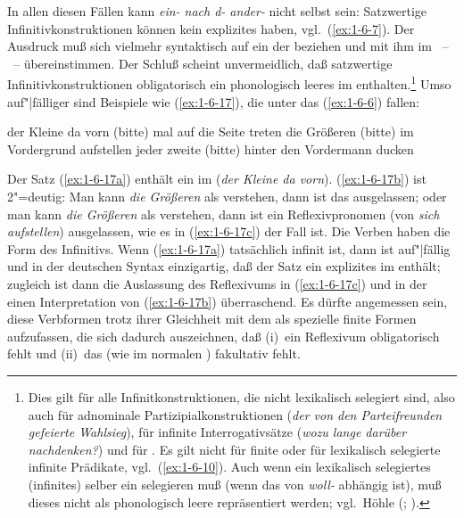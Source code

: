 \documentclass[output=paper]{langsci/langscibook}
\begin{document}
In allen diesen Fällen kann \textit{ein- nach d- ander-} nicht selbst  sein: Satzwertige Infinitivkonstruktionen können kein explizites  haben, vgl.\ (\ref{ex:1-6-7}). Der Ausdruck muß sich vielmehr syntaktisch auf ein  der  beziehen und mit ihm im ~-- ~– übereinstimmen. Der Schluß scheint unvermeidlich, daß satzwertige Infinitivkonstruktionen obligatorisch ein phonologisch
leeres  im  enthalten.\footnote{%
  Dies gilt für alle Infinitkonstruktionen, die nicht lexikalisch selegiert sind, also \zb auch
  für adnominale Partizipialkonstruktionen (\textit{der von den Parteifreunden gefeierte Wahlsieg}),
  für infinite Interrogativsätze (\textit{wozu lange darüber nachdenken?}) und für
  . Es gilt nicht für finite oder für lexikalisch selegierte
  infinite Prädikate, vgl.\ (\ref{ex:1-6-10}). Auch wenn ein lexikalisch selegiertes (infinites)
   selber ein  selegieren muß (\zb wenn das  von \textit{woll-} abhängig
  ist), muß dieses  nicht als phonologisch leere  repräsentiert werden;
  vgl.\ Höhle (\citeyear[84ff, 173ff]{Hoehle78a}; \citeyear[67ff]{Hoehle80}).%
}
Umso auf"|fälliger sind Beispiele wie (\ref{ex:1-6-17}), die unter das  (\ref{ex:1-6-6}) fallen:
\begin{exe}
\ex\label{ex:1-6-17}
\begin{xlist}
\ex\label{ex:1-6-17a} der Kleine da vorn (bitte) mal auf die Seite treten
\ex\label{ex:1-6-17b} die Größeren (bitte) im Vordergrund aufstellen
\ex\label{ex:1-6-17c} jeder zweite (bitte) hinter den Vordermann ducken
\end{xlist}
\end{exe}
Der Satz (\ref{ex:1-6-17a}) enthält ein  im  (\textit{der Kleine da vorn}). (\ref{ex:1-6-17b}) ist 2"=deutig: Man kann \textit{die Größeren} als  verstehen, dann ist das  ausgelassen; oder man kann \textit{die Größeren} als  verstehen, dann ist ein Reflexivpronomen (von \textit{sich aufstellen}) ausgelassen, wie es in (\ref{ex:1-6-17c}) der Fall ist. Die Verben haben die Form des Infinitivs. Wenn (\ref{ex:1-6-17a}) tatsächlich infinit ist, dann ist auf"|fällig und in der deutschen Syntax einzigartig, daß der Satz ein explizites  im  enthält; zugleich ist dann die Auslassung des Reflexivums in (\ref{ex:1-6-17c}) und in der
einen Interpretation von (\ref{ex:1-6-17b}) überraschend. Es dürfte angemessen sein, diese Verbformen trotz ihrer Gleichheit mit dem  als spezielle finite Formen aufzufassen,
die sich dadurch auszeichnen, daß (i)~ein Reflexivum obligatorisch fehlt und (ii)~das
 (wie im normalen ) fakultativ fehlt.
\end{document}
